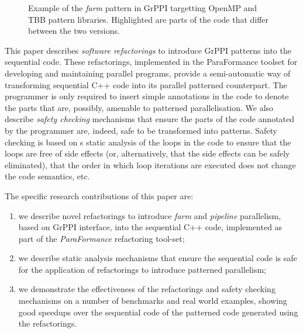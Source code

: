 \begin{figure}[t]
\centering
{}
\caption{Example of the \emph{farm} pattern in GrPPI targetting OpenMP and TBB pattern libraries. Highlighted are parts of the code that differ between the two versions.}
\label{fig:grppiExample}
\end{figure}

This paper describes \emph{software refactorings} to introduce GrPPI patterns into the sequential code. These refactorings, implemented in the ParaFormance toolset for developing and maintaining parallel programs, provide a semi-automatic way of transforming sequential C++ code into its parallel patterned counterpart. The programmer is only required to insert simple annotations in the code to denote the parts that are, possibly, amenable to patterned parallelisation. We also describe \emph{safety checking} mechanisms that ensure the parts of the code annotated by the programmer are, indeed, safe to be transformed into patterns. Safety checking is based on s static analysis of the loops in the code to ensure that the loops are free of side effects (or, alternatively, that the side effects can be safely eliminated), that the order in which loop iterations are executed does not change the code semantics, etc. 

The specific research contributions of this paper are:
\begin{enumerate}
    \item we describe novel refactorings to introduce \emph{farm} and \emph{pipeline} parallelism, based on GrPPI interface, into the sequential C++ code, implemented as part of the \emph{ParaFormance} refactoring tool-set;
    \item we describe static analysis mechanisms that ensure the sequential code is safe for the application of refactorings to introduce patterned parallelism;
    \item we demonstrate the effectiveness of the refactorings and safety checking mechanisms on a number of benchmarks and real world examples, showing good speedups over the sequential code of the patterned code generated using the refactorings.
\end{enumerate}



